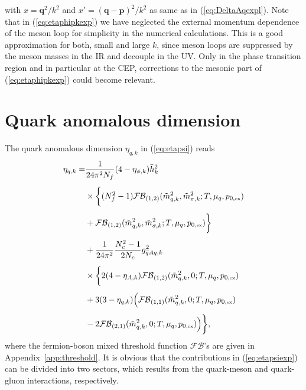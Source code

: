 \documentclass[%
reprint,
superscriptaddress,
showpacs,preprintnumbers,
 amsmath,amssymb,
 aps,
prd,
]{revtex4-1}
\def\eq#1{(\ref{#1})}
\def\app#1{Appendix~\ref{#1}}
\begin{document}
%
with $x=\bm{q}^2/k^2$ and $x'=(\bm{q}-\bm{p})^2/k^2$ as same as in
\eq{eq:DeltaAqexpl}. Note that in \eq{eq:etaphipkexp} we have
neglected the external momentum dependence of the meson loop for
simplicity in the numerical calculations. This is a good approximation
for both, small and large $k$, since meson loops are suppressed by the
meson masses in the IR and decouple in the UV. Only in the phase
transition region and in particular at the CEP, corrections to the
mesonic part of \eq{eq:etaphipkexp} could become relevant.


\section{Quark anomalous dimension}
\label{app:etaq}

The quark anomalous dimension $\eta_{q,k}$ in \eq{eq:etapsi} reads
%
\begin{align}
  \eta_{q,k}=
  &\frac{1}{24\pi^2N_{f}}(4-\eta_{\phi,k})\bar{h}_{k}^{2}\nonumber \\[1ex] 
  &\times\bigg\{(N_{f}^{2}-1)
    \mathcal{FB}_{(1,2)}(\tilde{m}_{q,k}^{2},\tilde{m}_{\pi,k}^{2};
    T,\mu_q,p_{0,\text{\tiny{ex}}})\nonumber \\[1ex] 
  &+\mathcal{FB}_{(1,2)}(\tilde{m}_{q,k}^{2},\tilde{m}_{\sigma,k}^{2};
    T,\mu_q,p_{0,\text{\tiny{ex}}})
    \bigg\}\nonumber \\[1ex] 
  &+\frac{1}{24\pi^2}\frac{N_c^2-1}{2N_c} g_{\bar q A q, k}^{2}\nonumber \\[1ex] 
  &\times\bigg\{2(4-\eta_{A,k}) \mathcal{FB}_{(1,2)}(\tilde{m}_{q,k}^{2},0;
    T,\mu_q,p_{0,\text{\tiny{ex}}})\nonumber \\[1ex] 
  &+3(3-\eta_{q,k})\Big( \mathcal{FB}_{(1,1)}(\tilde{m}_{q,k}^{2},0;
    T,\mu_q,p_{0,\text{\tiny{ex}}})\nonumber \\[1ex] 
  &-2 \mathcal{FB}_{(2,1)}(\tilde{m}_{q,k}^{2},0;T,\mu_q,p_{0,\text{\tiny{ex}}})
    \Big)\bigg\},\label{eq:etapsiexp}
\end{align}
%
where the fermion-boson mixed threshold function $\mathcal{FB}$'s are
given in \app{app:threshold}. It is obvious that the contributions in
\eq{eq:etapsiexp} can be divided into two sectors, which results from
the quark-meson and quark-gluon interactions, respectively.
\end{document}
